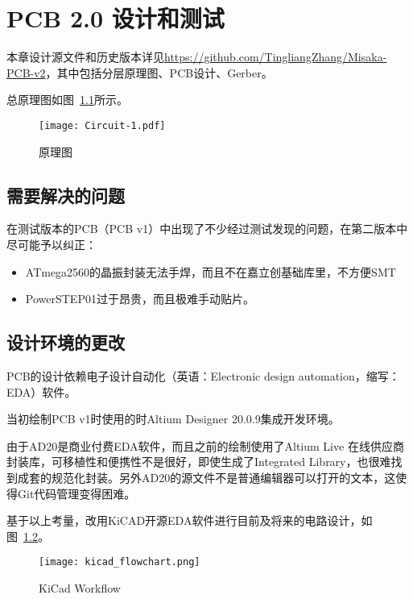 \chapter{PCB 2.0 设计和测试}
\label{cha:PCB-v2}

本章设计源文件和历史版本详见\url{https://github.com/TingliangZhang/Misaka-PCB-v2}，其中包括分层原理图、PCB设计、Gerber。

总原理图如图~\ref{fig:Circuit-1}所示。

\begin{figure}[htbp]
    \centering
    \texttt{[image: Circuit-1.pdf]}
    \caption{原理图}
    \label{fig:Circuit-1}
\end{figure}

\section{需要解决的问题}

在测试版本的PCB（PCB v1）中出现了不少经过测试发现的问题，在第二版本中尽可能予以纠正：

\begin{itemize}
    \item ATmega2560的晶振封装无法手焊，而且不在嘉立创基础库里，不方便SMT
    \item PowerSTEP01过于昂贵，而且极难手动贴片。
\end{itemize}

\section{设计环境的更改}

PCB的设计依赖电子设计自动化（英语：Electronic design automation，缩写：EDA）软件。

当初绘制PCB v1时使用的时Altium Designer 20.0.9集成开发环境。

由于AD20是商业付费EDA软件，而且之前的绘制使用了Altium Live 在线供应商封装库，可移植性和便携性不是很好，即使生成了Integrated Library，也很难找到成套的规范化封装。另外AD20的源文件不是普通编辑器可以打开的文本，这使得Git代码管理变得困难。

基于以上考量，改用KiCAD开源EDA软件进行目前及将来的电路设计，如图~\ref{fig:kicad_flowchart}。

\begin{figure}[htbp]
    \centering
    \texttt{[image: kicad\_flowchart.png]}
    \caption{KiCad Workflow}
    \label{fig:kicad_flowchart}
\end{figure}


